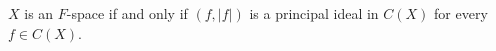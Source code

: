 $X$ is an $F$-space if and only if $(f, |f|)$ is a principal ideal in $C(X)$ for every $f \in C(X)$.
